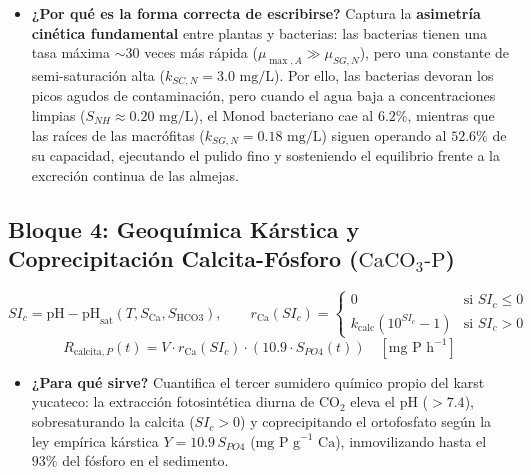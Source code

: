 \documentclass[11pt,letterpaper]{article}
\begin{document}
\begin{itemize}[leftmargin=1.5em]
    \item \textbf{¿Por qué es la forma correcta de escribirse?} Captura la \textbf{asimetría cinética fundamental} entre plantas y bacterias: las bacterias tienen una tasa máxima $\sim 30$ veces más rápida ($\mu_{\max,A} \gg \mu_{SG,N}$), pero una constante de semi-saturación alta ($k_{SC,N} = 3.0\text{ mg/L}$). Por ello, las bacterias devoran los picos agudos de contaminación, pero cuando el agua baja a concentraciones limpias ($S_{NH} \approx 0.20\text{ mg/L}$), el Monod bacteriano cae al $6.2\%$, mientras que las raíces de las macrófitas ($k_{SG,N} = 0.18\text{ mg/L}$) siguen operando al $52.6\%$ de su capacidad, ejecutando el pulido fino y sosteniendo el equilibrio frente a la excreción continua de las almejas.
\end{itemize}

\subsection{Bloque 4: Geoquímica Kárstica y Coprecipitación Calcita-Fósforo ($\text{CaCO}_3\text{-P}$)}

\begin{formulabox}
\begin{equation}
SI_c = \text{pH} - \text{pH}_{\text{sat}}\!\left(T, S_{\text{Ca}}, S_{\text{HCO3}}\right), \qquad r_{\text{Ca}}(SI_c) = \begin{cases} 0 & \text{si } SI_c \le 0 \\ k_{\text{calc}}\left(10^{SI_c} - 1\right) & \text{si } SI_c > 0 \end{cases}
\label{eq:sic}
\end{equation}
\begin{equation}
R_{\text{calcita},P}(t) = V \cdot r_{\text{Ca}}(SI_c) \cdot \left(10.9 \cdot S_{PO4}(t)\right) \quad [\text{mg P h}^{-1}]
\label{eq:rcalcitap}
\end{equation}
\end{formulabox}

\begin{itemize}[leftmargin=1.5em]
    \item \textbf{¿Para qué sirve?} Cuantifica el tercer sumidero químico propio del karst yucateco: la extracción fotosintética diurna de $\text{CO}_2$ eleva el pH ($>7.4$), sobresaturando la calcita ($SI_c > 0$) y coprecipitando el ortofosfato según la ley empírica kárstica $Y = 10.9\,S_{PO4}$ ($\text{mg P g}^{-1}\text{ Ca}$), inmovilizando hasta el $93\%$ del fósforo en el sedimento.
\end{itemize}
\end{document}
